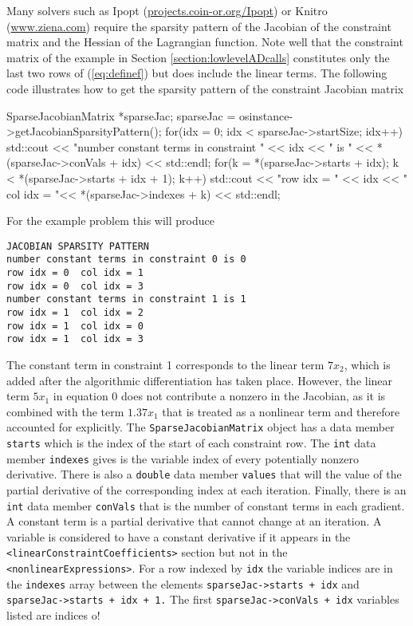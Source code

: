 \documentclass[11pt]{article}
\renewcommand{\_}{{\char"5F}}
\renewcommand{\{}{{\char"7B}}
\renewcommand{\}}{{\char"7D}}
\renewcommand{\^}{{\char"0D}}
\renewcommand{\'}{{\char"0D}}
\begin{document}
Many  solvers such as Ipopt (\url{projects.coin-or.org/Ipopt}) or Knitro (\url{www.ziena.com}) require the sparsity pattern of the Jacobian of the constraint matrix and the Hessian of the Lagrangian function.  Note well that the constraint matrix of the example in Section \ref{section:lowlevelADcalls} 
constitutes only the last two rows of (\ref{eq:definef}) but does include the linear terms.  The following code illustrates how to get the sparsity pattern of the constraint Jacobian matrix
\begin{verbatimtab}[4]
SparseJacobianMatrix *sparseJac;
sparseJac = osinstance->getJacobianSparsityPattern();
for(idx = 0; idx < sparseJac->startSize; idx++){
	std::cout << "number constant terms in constraint "   <<  idx << " is "
	<< *(sparseJac->conVals + idx)  << std::endl;
	for(k = *(sparseJac->starts + idx); k < *(sparseJac->starts + idx + 1); k++){
		std::cout << "row idx = " << idx <<  "
		col idx = "<< *(sparseJac->indexes + k) << std::endl;
	}
}
\end{verbatimtab}
For the example problem this will produce
\begin{verbatim}
JACOBIAN SPARSITY PATTERN
number constant terms in constraint 0 is 0
row idx = 0  col idx = 1
row idx = 0  col idx = 3
number constant terms in constraint 1 is 1
row idx = 1  col idx = 2
row idx = 1  col idx = 0
row idx = 1  col idx = 3
\end{verbatim}
The   constant term in constraint 1 corresponds to the linear term $7x_2$,
which is added after the algorithmic differentiation has taken place.
However, the linear  term $5x_1$ in equation 0 does not
contribute a nonzero in the Jacobian, as it is combined with the
term $1.37x_1$ that is treated as a nonlinear term and
therefore accounted for explicitly.
The {\tt SparseJacobianMatrix} object has a data member {\tt starts} which is the index of the start of each constraint row. The {\tt int} data member {\tt indexes}  gives  is the variable index of every potentially nonzero derivative. There is also a {\tt double} data member  {\tt values} that will the value of the partial derivative of the corresponding index at each iteration. Finally, there is an {\tt int} data member {\tt conVals} that is the number of constant terms in each gradient. A constant term is a partial derivative that cannot change at an iteration.  A variable is considered to have a constant derivative  if it appears in the {\tt <linearConstraintCoefficients>} section  but not in the {\tt <nonlinearExpressions>}.  For a row indexed by {\tt idx} the variable indices are in the  {\tt indexes} array between the elements {\tt sparseJac->starts + idx} and {\tt sparseJac->starts + idx + 1.}   The first  {\tt sparseJac->conVals + idx} variables listed are indices o!
 
\end{document}
